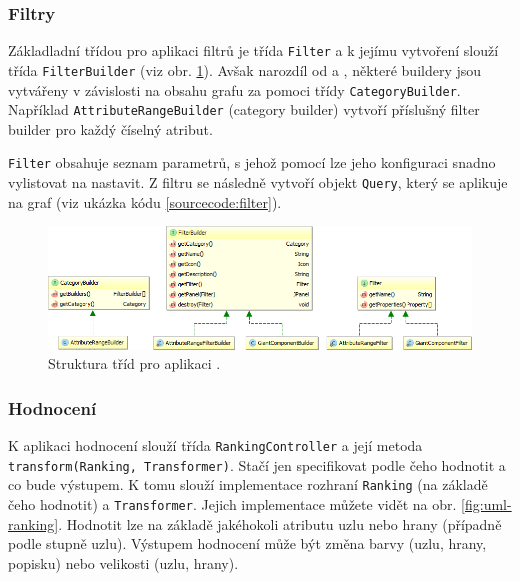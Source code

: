 \documentclass[thesis=M,czech]{FITthesis}[2014/05/6]
\begin{document}
\subsubsection{Filtry}
Základladní třídou pro aplikaci filtrů je třída \texttt{Filter} a k jejímu vytvoření slouží třída \texttt{FilterBuilder} (viz obr. \ref{fig:uml-filter}).
Avšak narozdíl od  a , některé buildery jsou vytvářeny v závislosti na obsahu grafu za pomoci třídy \texttt{CategoryBuilder}.
Například \texttt{AttributeRangeBuilder} (category builder) vytvoří příslušný filter builder pro každý číselný atribut. 

\texttt{Filter} obsahuje seznam parametrů, s jehož pomocí lze jeho konfiguraci snadno vylistovat na nastavit.
Z filtru se následně vytvoří objekt \texttt{Query}, který se aplikuje na graf (viz ukázka kódu \ref{sourcecode:filter}).

\begin{figure}\centering
 	\includegraphics[width=1\textwidth]{images/class-diagram/filter}
 	\caption[Struktura tříd pro výpočet ]{Struktura tříd pro aplikaci .}\label{fig:uml-filter}
\end{figure}



\subsubsection{Hodnocení}
K aplikaci hodnocení slouží třída \texttt{RankingController} a její metoda \texttt{transform\-(Rank\-ing, Trans\-former)}. Stačí jen specifikovat podle čeho hodnotit
a co bude výstupem. K tomu slouží implementace rozhraní \texttt{Ranking} (na základě čeho hodnotit) a \texttt{Transformer}. Jejich implementace můžete vidět na 
obr. \ref{fig:uml-ranking}. Hodnotit lze na základě jakéhokoli atributu uzlu nebo hrany (případně podle stupně uzlu). Výstupem hodnocení může být změna barvy (uzlu, hrany, popisku) 
nebo velikosti (uzlu, hrany).
\end{document}
